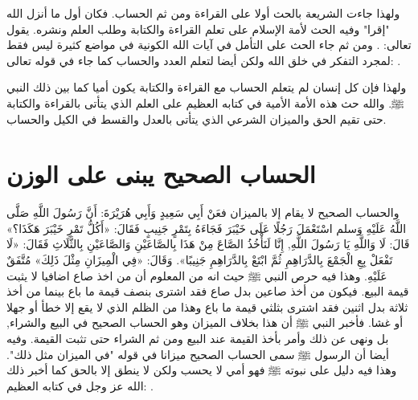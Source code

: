 ولهذا جاءت الشريعة بالحث أولا على القراءة ومن ثم الحساب. فكان أول ما أنزل الله "إقرا" وفيه الحث لأمة الإسلام على تعلم القراءة والكتابة وطلب العلم ونشره.
يقول تعالى:
\quranayah*[96][1-5]{\footnotesize \surahname*[96]}.
ومن ثم جاء الحث على التأمل في آيات الله الكونية في مواضع كثيرة ليس فقط لمجرد التفكر في خلق الله ولكن أيضا لتعلم العدد والحساب كما جاء في قوله تعالى:
\quranayah*[10][5]{\footnotesize \surahname*[10]}.


ولهذا فإن كل إنسان لم يتعلم الحساب مع القراءة والكتابة يكون أميا كما بين ذلك النبي ﷺ. والله حث هذه الأمة الأمية في كتابه العظيم على العلم الذي يتأتى بالقراءة والكتابة حتى تقيم الحق والميزان الشرعي الذي يتأتى بالعدل والقسط في الكيل والحساب.


\section{الحساب الصحيح يبنى على الوزن}

والحساب الصحيح لا يقام إلا بالميزان فعَنْ أَبِي سَعِيدٍ وَأَبِي هُرَيْرَةَ: أَنَّ رَسُولَ اللَّهِ صَلَّى اللَّهُ عَلَيْهِ وَسلم اسْتَعْمَلَ رَجُلًا عَلَى خَيْبَرَ فَجَاءَهُ بِتَمْرٍ جَنِيبٍ فَقَالَ: «أَكُلُّ تَمْرِ خَيْبَرَ هَكَذَا؟» قَالَ: لَا وَاللَّهِ يَا رَسُولَ اللَّهِ, إِنَّا لَنَأْخُذُ الصَّاعَ مِنْ هَذَا بِالصَّاعَيْنِ وَالصَّاعَيْنِ بِالثَّلَاثِ فَقَالَ: «لَا تَفْعَلْ بِعِ الْجَمْعَ بِالدَّرَاهِمِ ثُمَّ ابْتَعْ بِالدَّرَاهِمِ جَنِيبًا». وَقَالَ: «فِي الْمِيزَانِ مِثْلَ ذَلِكَ»
{\footnotesize مُتَّفَقٌ عَلَيْهِ}.
وهذا فيه حرص النبي ﷺ حيث انه من المعلوم أن من اخذ صاع اضافيا لا يثبت قيمة البيع. فيكون من أخذ صاعين بدل صاع فقد اشترى بنصف قيمة ما باع بينما من أخذ ثلاثة بدل اثنين فقد اشترى بثلثي قيمة ما باع وهذا من الظلم الذي لا يقع إلا خطأ أو جهلا أو غشا. فأخبر النبي ﷺ أن هذا بخلاف الميزان وهو الحساب الصحيح في البيع والشراء, بل ونهى عن ذلك وأمر بأخذ القيمة عند البيع ومن ثم الشراء حتى تثبت القيمة. وفيه أيضا أن الرسول ﷺ سمى الحساب الصحيح ميزانا في قوله "في الميزان مثل ذلك". وهذا فيه دليل على نبوته ﷺ فهو أمي لا يحسب ولكن لا ينطق إلا بالحق كما أخبر ذلك الله عز وجل في كتابه العظيم:
\quranayah*[53][3-4]{\footnotesize \surahname*[53]}.

